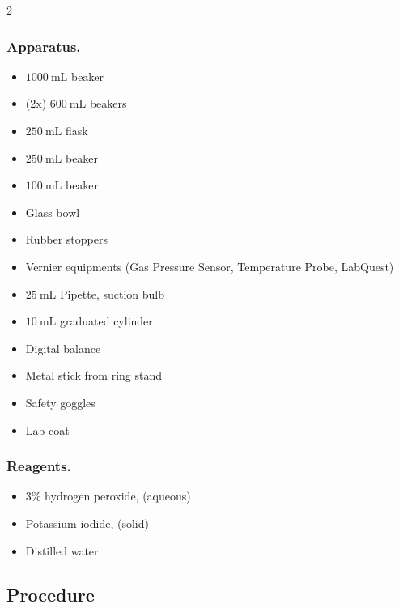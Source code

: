 \documentclass[hyphens]{article}
\begin{document}
\begin{multicols}{2}

\subsubsection*{Apparatus.}
\begin{itemize}
  \item $1000\ \text{mL}$ beaker
  \item (2x) $600\ \text{mL}$ beakers
  \item $250\ \text{mL}$ flask
  \item $250\ \text{mL}$ beaker
  \item $100\ \text{mL}$ beaker
  \item Glass bowl
  \item Rubber stoppers
  \item Vernier equipments (Gas Pressure Sensor, Temperature Probe, LabQuest)
  \item $25\ \text{mL}$ Pipette, suction bulb
  \item $10\ \text{mL}$ graduated cylinder
  \item Digital balance
  \item Metal stick from ring stand
  \item Safety goggles
  \item Lab coat
\end{itemize}

\columnbreak

\subsubsection*{Reagents.}
\begin{itemize}
  \item 3\% hydrogen peroxide,  (aqueous)
  \item Potassium iodide,  (solid)
  \item Distilled water
\end{itemize}

\end{multicols}

\subsection{Procedure}
\label{sec:research-design-procedure}
\end{document}
